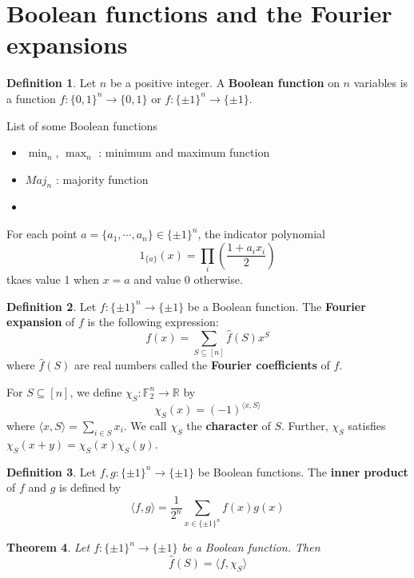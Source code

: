 \documentclass[11pt]{article}
\numberwithin{equation}{section}
\newtheorem{thm}{Theorem}[section]
\theoremstyle{definition}
\newtheorem{defn}[thm]{Definition}
\begin{document}
\setcounter{tocdepth}{3}

\tableofcontents

\clearpage

\section{Boolean functions and the Fourier expansions}

\begin{defn}\label{defn:bool_func}
	Let $n$ be a positive integer. A \textbf{Boolean function} on $n$ variables is a function $f:\{0,1\}^n \to \{0,1\}$ or $f:\{\pm 1\}^n \to \{\pm 1\}$.
\end{defn}

List of some Boolean functions
\begin{itemize}
	\item $\min_n$, $\max_n$ : minimum and maximum function
	\item $Maj_n$ : majority function
	\item
\end{itemize}

For each point $a = \{a_1, \cdots, a_n\} \in \{\pm 1\}^n$, the indicator polynomial
$$1_{\{a\}}(x) = \prod_i \left(\frac{1+a_i x_i}{2}\right)$$
tkaes value 1 when $x=a$ and value 0 otherwise.

\begin{defn}\label{defn:fourier_expansion}
	Let $f:\{\pm 1\}^n \to \{\pm 1\}$ be a Boolean function. The \textbf{Fourier expansion} of $f$ is the following expression:
	$$f(x) = \sum_{S \subseteq [n]} \hat{f}(S) x^S$$
	where $\hat{f}(S)$ are real numbers called the \textbf{Fourier coefficients} of $f$.

	For $S \subseteq [n]$, we define $\chi_S: \mathbb{F}_2^n \rightarrow \mathbb{R}$ by
	$$\chi_S(x) = (-1)^{\langle x, S \rangle}$$
	where $\langle x, S \rangle = \sum_{i \in S} x_i$. We call $\chi_S$ the \textbf{character} of $S$.
	Further, $\chi_S$ satisfies $\chi_S(x+y) = \chi_S(x) \chi_S(y)$.
\end{defn}

\begin{defn}\label{defn:inner_prod}
	Let $f,g: \{\pm 1\}^n \to \{\pm 1\}$ be Boolean functions. The \textbf{inner product} of $f$ and $g$ is defined by
	$$\langle f, g \rangle = \frac{1}{2^n} \sum_{x \in \{\pm 1\}^n} f(x) g(x)$$
\end{defn}

\begin{thm}\label{thm:fourier_expansion}
	Let $f:\{\pm 1\}^n \to \{\pm 1\}$ be a Boolean function. Then
	$$\hat{f}(S) = \langle f, \chi_S \rangle$$
\end{thm}
\end{document}
